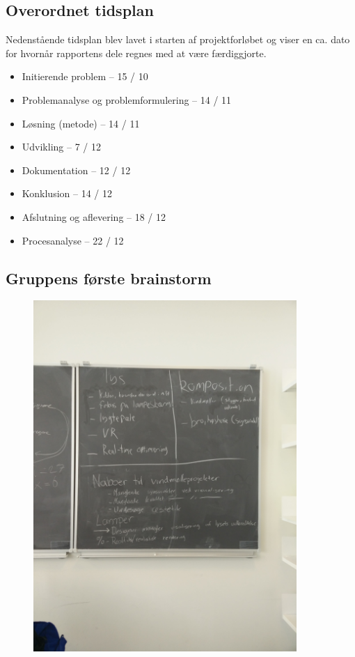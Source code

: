 \documentclass[oneside,a4paper,titlepage]{article}
\begin{document}
\subsection{Overordnet tidsplan}
\label{sec:tidsplan}
Nedenstående tidsplan blev lavet i starten af projektforløbet og viser en ca. dato for hvornår rapportens dele regnes med at være færdiggjorte.

\begin{itemize}
\item Initierende problem – 15 / 10
\item Problemanalyse og problemformulering – 14 / 11
\item Løsning (metode) – 14 / 11
\item Udvikling – 7 / 12
\item Dokumentation – 12 / 12
\item Konklusion – 14 / 12
\item Afslutning og aflevering – 18 / 12
\item Procesanalyse – 22 / 12
\end{itemize}
\clearpage

\subsection{Gruppens første brainstorm}
\label{sec:brainstorm}
\begin{figure}[H]
   \centering
   \includegraphics[width=10cm]{./../graphics/brainstorm_1}
\end{figure}
\clearpage
\end{document}
